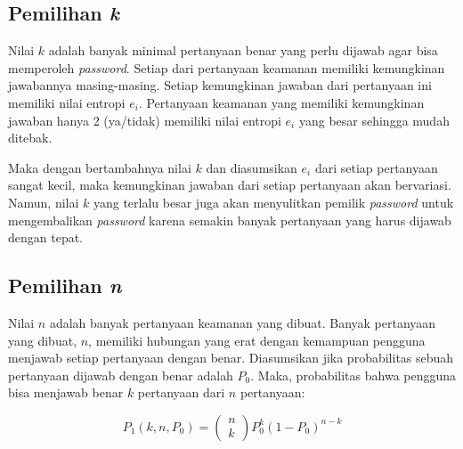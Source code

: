 \subsection{Pemilihan \textit{k}}

Nilai \begin{math}k\end{math} adalah banyak minimal pertanyaan benar yang perlu dijawab agar bisa memperoleh \textit{password}. Setiap dari pertanyaan keamanan memiliki kemungkinan jawabannya masing-masing. Setiap kemungkinan jawaban dari pertanyaan ini memiliki nilai entropi \begin{math}e_i\end{math}. Pertanyaan keamanan yang memiliki kemungkinan jawaban hanya 2 (ya/tidak) memiliki nilai entropi \begin{math}e_i\end{math} yang besar sehingga mudah ditebak.

Maka dengan bertambahnya nilai \begin{math}k\end{math} dan diasumsikan \begin{math}e_i\end{math} dari setiap pertanyaan sangat kecil, maka kemungkinan jawaban dari setiap pertanyaan akan bervariasi. Namun, nilai \begin{math}k\end{math} yang terlalu besar juga akan menyulitkan pemilik \textit{password} untuk mengembalikan \textit{password} karena semakin banyak pertanyaan yang harus dijawab dengan tepat.

\subsection{Pemilihan \textit{n}}

Nilai \begin{math}n\end{math} adalah banyak pertanyaan keamanan yang dibuat. Banyak pertanyaan yang dibuat, $n$, memiliki hubungan yang erat dengan kemampuan pengguna menjawab setiap pertanyaan dengan benar. Diasumsikan jika probabilitas sebuah pertanyaan dijawab dengan benar adalah $P_0$. Maka, probabilitas bahwa pengguna bisa menjawab benar $k$ pertanyaan dari $n$ pertanyaan\cite{ellison2000protecting}:

\begin{equation}
	P_1(k,n,P_0) = \left(\begin{array}{c}n\\k\end{array}\right) P_0^k (1-P_0)^{n-k}
	\label{eq:pilihn1}
\end{equation}

